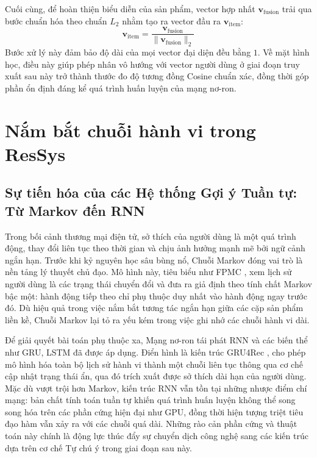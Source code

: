 Cuối cùng, để hoàn thiện biểu diễn của sản phẩm, vector hợp nhất $\mathbf{v}_{\text{fusion}}$ trải qua bước chuẩn hóa theo chuẩn $L_2$ nhằm tạo ra vector đầu ra $\mathbf{v}_{\text{item}}$:
\begin{equation}
    \mathbf{v}_{\text{item}} = \frac{\mathbf{v}_{\text{fusion}}}{\|\mathbf{v}_{\text{fusion}}\|_2}
\end{equation}
Bước xử lý này đảm bảo độ dài của mọi vector đại diện đều bằng $1$. Về mặt hình học, điều này giúp phép nhân vô hướng với vector người dùng ở giai đoạn truy xuất sau này trở thành thước đo độ tương đồng Cosine chuẩn xác, đồng thời góp phần ổn định đáng kể quá trình huấn luyện của mạng nơ-ron.

\section{Nắm bắt chuỗi hành vi trong ResSys}

\subsection{Sự tiến hóa của các Hệ thống Gợi ý Tuần tự: Từ Markov đến RNN}

Trong bối cảnh thương mại điện tử, sở thích của người dùng là một quá trình động, thay đổi liên tục theo thời gian và chịu ảnh hưởng mạnh mẽ bởi ngữ cảnh ngắn hạn. Trước khi kỷ nguyên học sâu bùng nổ, Chuỗi Markov đóng vai trò là nền tảng lý thuyết chủ đạo. Mô hình này, tiêu biểu như FPMC \cite{26}, xem lịch sử người dùng là các trạng thái chuyển đổi và đưa ra giả định theo tính chất Markov bậc một: hành động tiếp theo chỉ phụ thuộc duy nhất vào hành động ngay trước đó. Dù hiệu quả trong việc nắm bắt tương tác ngắn hạn giữa các cặp sản phẩm liền kề, Chuỗi Markov lại tỏ ra yếu kém trong việc ghi nhớ các chuỗi hành vi dài.

Để giải quyết bài toán phụ thuộc xa, Mạng nơ-ron tái phát RNN và các biến thể như GRU, LSTM đã được áp dụng. Điển hình là kiến trúc GRU4Rec \cite{30}, cho phép mô hình hóa toàn bộ lịch sử hành vi thành một chuỗi liên tục thông qua cơ chế cập nhật trạng thái ẩn, qua đó trích xuất được sở thích dài hạn của người dùng. Mặc dù vượt trội hơn Markov, kiến trúc RNN vẫn tồn tại những nhược điểm chí mạng: bản chất tính toán tuần tự khiến quá trình huấn luyện không thể song song hóa trên các phần cứng hiện đại như GPU, đồng thời hiện tượng triệt tiêu đạo hàm vẫn xảy ra với các chuỗi quá dài. Những rào cản phần cứng và thuật toán này chính là động lực thúc đẩy sự chuyển dịch công nghệ sang các kiến trúc dựa trên cơ chế Tự chú ý trong giai đoạn sau này.

